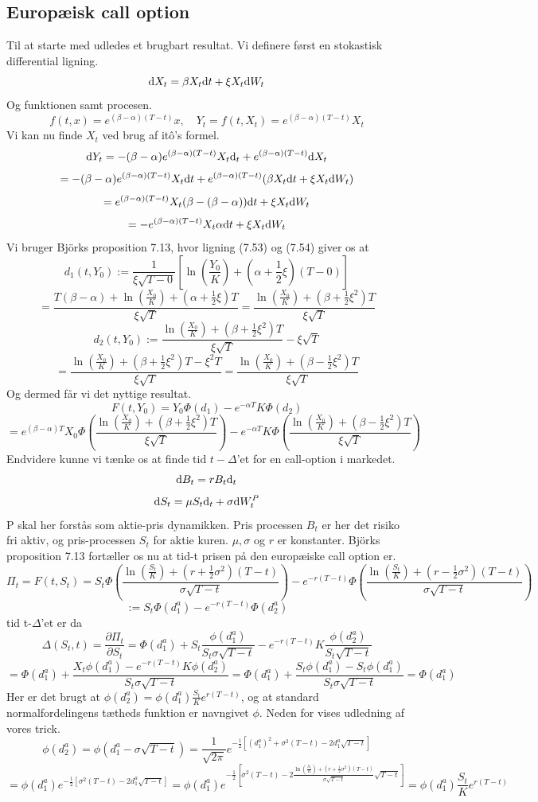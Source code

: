 \documentclass{article}
\theoremstyle{definition}
\theoremstyle{remark}
\begin{document}
\subsection{Europæisk call option}
Til at starte med udledes et brugbart resultat. Vi definere først en stokastisk differential ligning.
$$\text d X_t = \beta X_t\text dt+\xi X_t \text dW_t$$
Og funktionen samt procesen.
$$f(t,x)=e^{(\beta-\alpha)(T-t)}x,\quad Y_t=f(t,X_t)=e^{(\beta-\alpha)(T-t)}X_t$$
Vi kan nu finde $X_t$ ved brug af itô's formel.
$$\text dY_t=-(\beta-\alpha)e^{(\beta-\alpha)(T-t)}X_t\text d_t+e^{(\beta-\alpha)(T-t)}\text dX_t$$
$$=-(\beta-\alpha)e^{(\beta-\alpha)(T-t)}X_t\text dt+e^{(\beta-\alpha)(T-t)}(\beta X_t\text dt+\xi X_t\text dW_t)$$
$$=e^{(\beta-\alpha)(T-t)}X_t(\beta-(\beta-\alpha))\text dt+\xi X_t\text dW_t$$
$$=-e^{(\beta-\alpha)(T-t)}X_t\alpha\text dt+\xi X_t\text dW_t$$
Vi bruger Björks proposition 7.13, hvor ligning (7.53) og (7.54) giver os at
$$d_1(t,Y_0) :=\frac{1}{\xi\sqrt{T-0}}\left[\ln\left(\frac{Y_0}{K}\right)+(\alpha+\frac12\xi)(T-0) \right]$$
$$=\frac{T(\beta-\alpha)+\ln\left(\frac{X_0}{K}\right)+(\alpha+\frac12\xi)T}{\xi\sqrt T}=\frac{\ln\left(\frac{X_0}{K}\right)+(\beta+\frac12\xi^2)T}{\xi\sqrt T}$$
$$d_2(t,Y_0):=\frac{\ln\left(\frac{X_0}{K}\right)+(\beta+\frac12\xi^2)T}{\xi\sqrt T}-\xi\sqrt{T}$$
$$=\frac{\ln\left(\frac{X_0}{K}\right)+(\beta+\frac12\xi^2)T-\xi^2T}{\xi\sqrt T}=\frac{\ln\left(\frac{X_0}{K}\right)+(\beta-\frac12\xi^2)T}{\xi\sqrt T}$$
Og dermed får vi det nyttige resultat.
$$F(t,Y_0)=Y_0\Phi(d_1)-e^{-\alpha T}K\Phi(d_2)$$
$$=e^{(\beta-\alpha)T}X_0\Phi\left(\frac{\ln\left(\frac{X_0}{K}\right)+(\beta+\frac12\xi^2)T}{\xi\sqrt T}\right)-e^{-\alpha T}K\Phi\left(\frac{\ln\left(\frac{X_0}{K}\right)+(\beta-\frac12\xi^2)T}{\xi\sqrt T}\right)$$
Endvidere kunne vi tænke os at finde tid $t-\Delta$'et for en call-option i markedet.
$$\text dB_t = rB_t\text d_t$$
$$\text d S_t = \mu S_t\text d_t +\sigma \text dW_t^P$$
P skal her forstås som aktie-pris dynamikken. Pris processen $B_t$ er her det risiko fri aktiv, og pris-processen $S_t$ for aktie kuren. $\mu,\sigma$ og $r$ er konstanter. Björks proposition 7.13 fortæller os nu at tid-t prisen på den europæiske call option er.
$$\Pi_t=F(t,S_t)=S_t\Phi\left(\frac{\ln\left(\frac{S_t}{K}\right)+(r+\frac12\sigma^2)(T-t)}{\sigma\sqrt{T-t}}\right)-e^{-r(T-t)}\Phi\left(\frac{\ln\left(\frac{S_t}{K}\right)+(r-\frac12\sigma^2)(T-t)}{\sigma\sqrt{T-t}}\right)$$
$$:= S_t\Phi(d_1^a)-e^{-r(T-t)}\Phi(d_2^a)$$
tid t-$\Delta$'et er da
$$\Delta(S_t,t) = \frac{\partial \Pi_t}{\partial S_t}=\Phi(d_1^a)+S_t\frac{\phi(d_1^a)}{S_t\sigma\sqrt{T-t}}-e^{-r(T-t)}K\frac{\phi(d_2^a)}{S_t\sqrt{T-t}}$$
$$=\Phi(d_1^a)+\frac{X_t\phi(d_1^a)-e^{-r(T-t)}K\phi(d_2^a)}{S_t\sigma\sqrt{T-t}}=\Phi(d_1^a)+\frac{S_t\phi(d_1^a)-S_t\phi(d_1^a)}{S_t\sigma\sqrt{T-t}}=\Phi(d_1^a)$$
Her er det brugt at $\phi(d_2^a)=\phi(d_1^a)\frac{S_t}{K}e^{r(T-t)}$, og at standard normalfordelingens tætheds funktion er navngivet $\phi$. Neden for vises udledning af vores trick.
$$\phi(d_2^a)=\phi(d_1^a-\sigma\sqrt{T-t})=\frac{1}{\sqrt{2\pi}}e^{-\frac12\left[(d_1^a)^2+\sigma^2(T-t)-2d_1^a\sqrt{T-t}\right]}$$
$$=\phi(d_1^a)e^{-\frac12\left[\sigma^2(T-t)-2d_1^a\sqrt{T-t}\right]}=\phi(d_1^a)e^{-\frac12\left[\sigma^2(T-t)-2\frac{\ln\left(\frac{S_t}{K}\right)+(r+\frac12\sigma^2)(T-t)}{\sigma\sqrt{T-t}}\sqrt{T-t}\right]}=\phi(d_1^a)\frac{S_t}{K}e^{r(T-t)}$$
\end{document}
